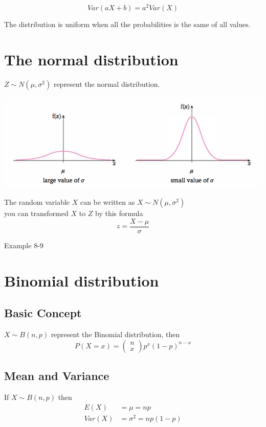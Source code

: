 \documentclass[a4paper]{article}
\begin{document}
\[
	Var(aX+b)=a^2Var(X)
\]
\begin{defi}
	The distribution is uniform when all the probabilities is the same of all values.
\end{defi}


\section{The normal distribution}
$Z\sim  N(\mu,\sigma^2)$ represent the normal distribution.\\

\begin{center}
	\includegraphics[scale=0.5]{img_S/8_intro}
\end{center}

The random variable $X$ can be written as $X\sim  N(\mu,\sigma^2)$\\

you can transformed $X$ to $Z$ by this formula
\[
	z=\frac{X-\mu}{\sigma}
\]
\begin{eg}
	Example 8-9
\end{eg}

\section{Binomial distribution}
\subsection{Basic Concept}
$X\sim B(n,p)$ represent the Binomial distribution, then
\[
	P(X=x)=\begin{pmatrix}n\\x\end{pmatrix}p^x(1-p)^{n-x}
\]

\subsection{Mean and Variance}
If $X\sim B(n,p)$ then
\begin{align*}
	E(X)   & =\mu=np           \\
	Var(X) & =\sigma^2=np(1-p)
\end{align*}
\end{document}
